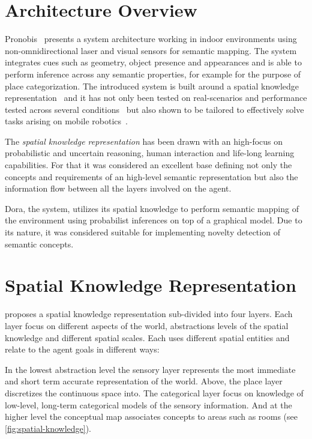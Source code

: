 \section{Architecture Overview}
Pronobis~\cite{pronobis2011phd} presents a system architecture working in indoor environments using
non\hyp{}omnidirectional laser and visual sensors for semantic mapping. The system integrates cues such as geometry,
object presence and appearances and is able to perform inference across any semantic properties,
for example for the purpose of place categorization.
The introduced system is built around a spatial knowledge representation~\cite{pronobis2010ias} and it has not only been tested on real-scenarios
and performance tested across several conditions~\cite{pronobis2007iros} but also shown
to be tailored to effectively solve tasks arising on mobile robotics~\cite{hanheide2011ijcai}.

The \emph{spatial knowledge representation} has been drawn with an high-focus on probabilistic
and uncertain reasoning, human interaction and life-long learning capabilities.
For that it was considered an excellent base defining not only the concepts and
requirements of an high-level semantic representation but also the information flow
between all the layers involved on the agent.

\gls{Dora}, the system, utilizes its spatial knowledge to perform semantic mapping of the environment
using probabilist inferences on top of a graphical model.
Due to its nature, it was considered suitable for implementing novelty detection of semantic concepts.

\section{Spatial Knowledge Representation}
\cite{pronobis2010ias} proposes a spatial knowledge representation sub-divided into four layers.
Each layer focus on different aspects of the world, abstractions levels of the spatial knowledge
and different spatial scales. Each uses different spatial entities and relate to the agent
goals in different ways:

In the lowest abstraction level the sensory layer represents the most immediate and short term
accurate representation of the world. Above, the place layer discretizes the continuous
space into. The categorical layer focus on knowledge of low\hyp{}level, long\hyp{}term
categorical models of the sensory information. And at the higher level the conceptual map
associates concepts to areas such as rooms (see \autoref{fig:spatial-knowledge}).

